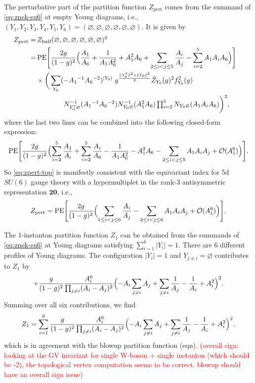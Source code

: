 \documentclass[letterpaper, 11pt]{article}
\begin{document}
{The perturbative part of the partition function $Z_{\text{pert}}$ comes from the summand of \eqref{eq:znek-su6} at empty Young diagrams, i.e., $(Y_1, Y_2, Y_3, Y_4, Y_5, Y_6) = (\varnothing,\varnothing,\varnothing,\varnothing,\varnothing,\varnothing)$. It is given by
\begin{align}
  \label{eq:zpert-top}
Z_{\rm pert} 
=& \,
Z_{\text{half}}(\varnothing,\varnothing,\varnothing,\varnothing,\varnothing,\varnothing)^2
\cr
=&\, 
\text{PE} \Biggl[ 
\frac{2g}{(1-g)^2} 
\Bigl( \frac{A_1}{A_6} + \frac{1}{A_1A_6^2} + A_1^2  A_6 
+ \sum_{2 \le i <  j \le 5} \frac{A_i}{A_j}
- \sum_{i=2}^5 A_1 A_i  A_6
\Bigr)
\Biggr]
\cr 
& 
\times \bigg(\sum_{Y_0} ( - A_1{}^{-1} A_6{}^{-2})^{|Y_0|} \ 
g^{\frac{\Vert Y_0^t \Vert ^2+\Vert Y_0\Vert ^2}{2}} \tilde{Z}_{Y_0}(g)^2 f_{Y_0}^2(g)
\cr 
& \qquad \qquad
\textstyle N_{Y_0^t \varnothing }^{-1} (A_1{}^{-1} A_6{}^{-2})
 N^{-1}_{Y_0 \varnothing } (A_1^2  A_6)\prod_{i=2}^5 N_{Y_0 \varnothing } (A_1 A_i  A_6)\bigg)^2 ,
\end{align}
where the last two lines can be  combined into the following closed-form expression:
\begin{align}
  \text{PE} \Biggl[ 
    \frac{2g}{(1-g)^2} 
    \Bigl(\sum_{i=2}^5  \frac{A_1}{A_i} +\sum_{i=2}^5  \frac{A_i}{A_6} - \frac{1}{A_1A_6^2} - A_1^2  A_6 
    - \sum_{2\leq i<j \leq 5} A_1 A_i  A_j + \mathcal{O}(A_1^6)
    \Bigr)
    \Biggr].
\end{align}
So \eqref{eq:zpert-top} is manifestly consistent with the equivariant index  \cite{Shadchin:2005mx} for 5d $SU(6)$ gauge theory with a hypermultiplet in the rank-3 antisymmetric representation $\mathbf{20}$, i.e., 
\begin{align}
  Z_{\rm pert}  = \text{PE} \Biggl[ 
    \frac{2g}{(1-g)^2} 
    \Bigl(\sum_{1\leq i<j \leq 6}  \frac{A_i}{A_j} 
    - \sum_{2\leq i<j \leq 6} A_1 A_i  A_j + \mathcal{O}(A_1^6)
    \Bigr)
    \Biggr].
\end{align}

The 1-instanton partition function $Z_1$ can be obtained from the summands of \eqref{eq:znek-su6} at Young diagrams satisfying $\sum_{i=1}^6 |Y_i|=1$. There are 6 different profiles of Young diagrams. The configuration $|Y_i| = 1$ and $Y_{j\neq i} = \varnothing$ contributes to $Z_{1}$ by
\begin{align}
  + \frac{g}{(1-g)^2} \frac{A_i^6}{\prod_{j \neq i} (A_i - A_j)^2} 
  \Bigl(-A_i \sum_{j\neq i} A_j +  \sum_{j\neq i}\frac{1}{A_j}  - \frac{1}{A_i} + A_i^2
 \Bigr)^2. 
\end{align}
Summing over all six contributions, we find
\begin{align}
  Z_1 = \sum_{i=1}^6 \frac{g}{(1-g)^2} \frac{A_i^6}{\prod_{j \neq i} (A_i - A_j)^2} 
  \Bigl(-A_i \sum_{j\neq i} A_j +  \sum_{j\neq i}\frac{1}{A_j}  - \frac{1}{A_i} + A_i^2
 \Bigr)^2. 
\end{align}
which is in agreement with the blowup partition function (eqn). \textcolor{red}{(overall sign: looking at the GV invariant for single W-boson + single instanton (which should be -2), the topological vertex computation seems to be correct. blowup should have an overall sign issue)}
\pagebreak

}
\end{document}
